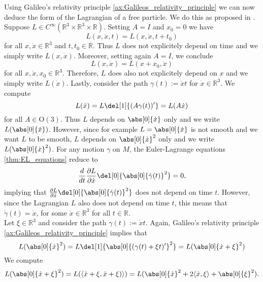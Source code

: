 Using Galileo's relativity principle \ref{ax:Galileos_relativity_principle} we can now deduce the form of the Lagrangian of a free particle. We do this as proposed in \cite[5--7]{landau:mechanics:1981}. Suppose $L \in C^\infty(\mathbb{R}^3 \times \mathbb{R}^3 \times \mathbb{R})$. Setting $A = I$ and $x_0 = 0$ we have 
\begin{equation*}
	L(x,\dot{x},t) = L(x,\dot{x},t + t_0)
\end{equation*}
\noindent for all $x,\dot{x} \in \mathbb{R}^3$ and $t,t_0 \in \mathbb{R}$. Thus $L$ does not explicitely depend on time and we simply write $L(x,\dot{x})$. Moreover, setting again $A = I$, we conclude
\begin{equation*}
	L(x,\dot{x}) = L(x + x_0,\dot{x})
\end{equation*}
\noindent for all $x,\dot{x},x_0 \in \mathbb{R}^3$. Therefore, $L$ does also not explicitely depend on $x$ and we simply write $L(\dot{x})$. Lastly, consider the path $\gamma(t) := \dot{x}t$ for $\dot{x} \in \mathbb{R}^3$. We compute
\begin{equation*}
	L(\dot{x}) = L\del[1]{(A\gamma(t))'} = L(A\dot{x})
\end{equation*}
\noindent for all $A \in \mathrm{O}(3)$. Thus $L$ depends on $\abs[0]{\dot{x}}$ only and we write $L(\abs[0]{\dot{x}})$. However, since for example $L = \abs[0]{\dot{x}}$ is not smooth and we want $L$ to be smooth, $L$ depends on $\abs[0]{\dot{x}}^2$ only and we write $L(\abs[0]{\dot{x}}^2)$. For any motion $\gamma$ on $M$, the Euler-Lagrange equations \ref{thm:EL_equations} reduce to
\begin{equation*}
	\frac{d}{dt} \frac{\partial L}{\partial \dot{x}}\del[0]{\abs[0]{\dot{\gamma}(t)}^2} = 0,
\end{equation*}
\noindent implying that $\frac{\partial L}{\partial \dot{x}}\del[0]{\abs[0]{\dot{\gamma}(t)}^2}$ does not depend on time $t$. However, since the Lagrangian $L$ also does not depend on time $t$, this means that $\dot{\gamma}(t) = \dot{x}$, for some $\dot{x} \in \mathbb{R}^3$ for all $t \in \mathbb{R}$.\\
Let $\xi \in \mathbb{R}^3$ and consider the path $\gamma(t) := \dot{x}t$. Again, Galileo's relativity principle \ref{ax:Galileos_relativity_principle} implies that
\begin{equation*}
	L(\abs[0]{\dot{x}}^2) = L\del[1]{\abs[0]{(\gamma(t) + \xi t)'}^2} = L(\abs[0]{\dot{x} + \xi}^2)
\end{equation*}
We compute
\begin{equation*}
	L(\abs[0]{\dot{x} + \xi}^2) = L(\langle \dot{x} + \xi, \dot{x} + \xi)\rangle) = L(\abs[0]{\dot{x}}^2 + 2\langle \dot{x},\xi \rangle + \abs[0]{\xi}^2).
\end{equation*}

